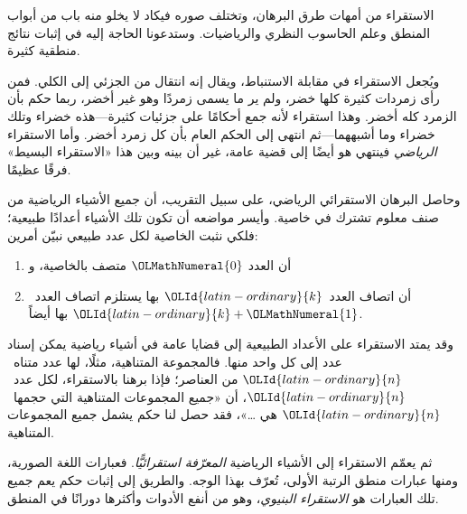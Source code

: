 \documentclass[../../../include/open-logic-section]{subfiles}
\begin{document}


الاستقراء من أمهات طرق البرهان، وتختلف صوره فيكاد لا يخلو منه باب من
أبواب المنطق وعلم الحاسوب النظري والرياضيات. وستدعونا الحاجة إليه في
إثبات نتائج منطقية كثيرة.

ويُجعل الاستقراء في مقابلة الاستنباط، ويقال إنه انتقال من الجزئي إلى
الكلي. فمن رأى زمردات كثيرة كلها خضر، ولم ير ما يسمى زمردًا وهو غير
أخضر، ربما حكم بأن الزمرد كله أخضر. وهذا استقراء لأنه جمع أحكامًا على
جزئيات كثيرة---هذه خضراء وتلك خضراء وما أشبههما---ثم انتهى إلى الحكم
العام بأن كل زمرد أخضر. وأما الاستقراء \emph{الرياضي} فينتهي هو أيضًا
إلى قضية عامة، غير أن بينه وبين هذا «الاستقراء البسيط» فرقًا عظيمًا.

وحاصل البرهان الاستقرائي الرياضي، على سبيل التقريب، أن جميع الأشياء
الرياضية من صنف معلوم تشترك في خاصية. وأيسر مواضعه أن تكون تلك
الأشياء أعدادًا طبيعية؛ فلكي نثبت الخاصية لكل عدد طبيعي نبيّن أمرين:
\begin{enumerate}
    \item أن العدد $\OLMathNumeral{0}$ متصف بالخاصية، و
    \item أن اتصاف العدد~$\OLId{latin-ordinary}{k}$ بها يستلزم اتصاف العدد~$\OLId{latin-ordinary}{k}+\OLMathNumeral{1}$ بها أيضاً.
\end{enumerate}
وقد يمتد الاستقراء على الأعداد الطبيعية إلى قضايا عامة في أشياء
رياضية يمكن إسناد عدد إلى كل واحد منها. فالمجموعة المتناهية، مثلًا،
لها عدد متناه~$\OLId{latin-ordinary}{n}$ من العناصر؛ فإذا برهنا بالاستقراء، لكل عدد~$\OLId{latin-ordinary}{n}$، أن
«جميع المجموعات المتناهية التي حجمها~$\OLId{latin-ordinary}{n}$ هي \dots»، فقد حصل لنا حكم
يشمل جميع المجموعات المتناهية.

ثم يعمّم الاستقراء إلى الأشياء الرياضية \emph{المعرّفة استقرائيًّا}.
فعبارات اللغة الصورية، ومنها عبارات منطق الرتبة الأولى، تُعرّف بهذا
الوجه. والطريق إلى إثبات حكم يعم جميع تلك العبارات هو
\emph{الاستقراء البنيوي}، وهو من أنفع الأدوات وأكثرها دورانًا في
المنطق.
\end{document}
